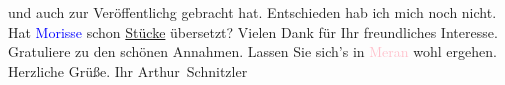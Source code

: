                und auch zur Veröffentlichg gebracht hat. Entschieden hab ich mich noch nicht. Hat
               \textcolor{blue}{Morisse}\ledrightnote{\textcolor{blue}{Paul Morisse}} schon \uline{Stücke} übersetzt? Vielen Dank für Ihr
               freundliches Interesse. Gratuliere zu den schönen Annahmen. Lassen Sie sich’s in \textcolor{pink}{Meran}\ledrightnote{\textcolor{pink}{Meran}} wohl ergehen. Herzliche Grüße. Ihr\pend
           \pstart \spacefill\mbox{Arthur Schnitzler}\pend{}\endnumbering{}  
      